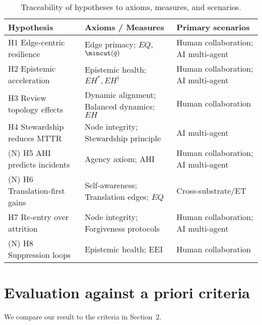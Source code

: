 \documentclass[12pt]{article}
\begin{document}
\begin{table}[htbp]
\centering
\small
\caption{Traceability of hypotheses to axioms, measures, and scenarios.}
\label{tab:traceability}
\begin{tabularx}{\linewidth}{lYY}
\toprule
\textbf{Hypothesis} & \textbf{Axioms / Measures} & \textbf{Primary scenarios} \\
\midrule
H1 Edge-centric resilience & Edge primacy; $EQ$, $\mincut(\bar q)$ & Human collaboration; AI multi-agent \\
H2 Epistemic acceleration & Epistemic health; $EH^{\ast}, EH^{\dagger}$ & Human collaboration; AI multi-agent \\
H3 Review topology effects & Dynamic alignment; Balanced dynamics; $EH$ & Human collaboration \\
H4 Stewardship reduces MTTR & Node integrity; Stewardship principle & AI multi-agent \\ (N)
H5 AHI predicts incidents & Agency axiom; AHI & Human collaboration; AI multi-agent \\ (N)
H6 Translation-first gains & Self-awareness; Translation edges; $EQ$ & Cross-substrate/ET \\
H7 Re-entry over attrition & Node integrity; Forgiveness protocols & Human collaboration; AI multi-agent \\ (N)
H8 Suppression loops & Epistemic health; EEI & Human collaboration \\

\bottomrule
\end{tabularx}
\end{table}

\section{Evaluation against a priori criteria}\label{sec:criteria-eval} We compare our result to the criteria in Section~2.
\end{document}
